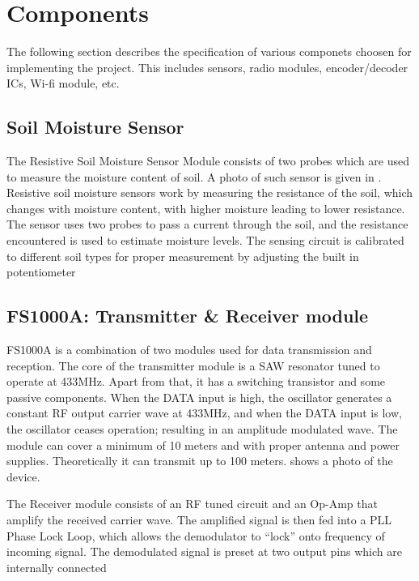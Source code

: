 \pagebreak
\section{Components}
The following section describes the specification of various componets choosen for implementing the project. This includes sensors, radio modules, encoder/decoder ICs, Wi-fi module, etc.
\subsection{Soil Moisture Sensor}

\setlength\intextsep{0pt}
\setlength{\columnsep}{.6cm}

The Resistive Soil Moisture Sensor Module consists of two probes which are used to measure the moisture content of soil. A photo of such sensor is given in . Resistive soil moisture sensors work by measuring the resistance of the soil, which changes with moisture content, with higher moisture leading to lower resistance. The sensor uses two probes to pass a current through the soil, and the resistance encountered is used to estimate moisture levels. The sensing circuit is calibrated to different soil types for proper measurement by adjusting the built in potentiometer\\[5pt]


\subsection{FS1000A: Transmitter \& Receiver module}

FS1000A is a combination of two modules used for data transmission and reception. The core of the transmitter module is a SAW resonator tuned to operate at 433MHz. Apart from that, it has a switching transistor and some passive components. When the DATA input is high, the oscillator generates a constant RF output carrier wave at 433MHz, and when the DATA input is low, the oscillator ceases operation; resulting in an amplitude modulated wave. The module can cover a minimum of 10 meters and with proper antenna and power supplies. Theoretically it can transmit up to 100 meters\cite{fs1000a}.  shows a photo of the device.


The Receiver module consists of an RF tuned circuit and an Op-Amp that amplify the received carrier wave. The amplified signal is then fed into a PLL Phase Lock Loop, which allows the demodulator to “lock” onto frequency of incoming signal. The demodulated signal is preset at two output pins which are internally connected

